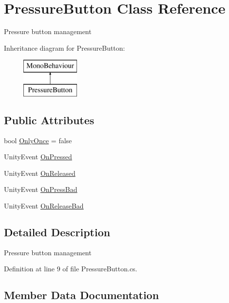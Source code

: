 \hypertarget{class_pressure_button}{}\section{Pressure\+Button Class Reference}
\label{class_pressure_button}


Pressure button management  


Inheritance diagram for Pressure\+Button\+:\begin{figure}[H]
\begin{center}
\leavevmode
\includegraphics[height=2.000000cm]{class_pressure_button}
\end{center}
\end{figure}
\subsection*{Public Attributes}
\begin{DoxyCompactItemize}
\item 
bool \mbox{\hyperlink{class_pressure_button_af684466a3f6afe1da890e20c265d07c6}{Only\+Once}} = false
\item 
Unity\+Event \mbox{\hyperlink{class_pressure_button_a75331263686a56126a5048151a05855c}{On\+Pressed}}
\item 
Unity\+Event \mbox{\hyperlink{class_pressure_button_af4513018957a5721b4ecdd58f5c9f8ff}{On\+Released}}
\item 
Unity\+Event \mbox{\hyperlink{class_pressure_button_a39553f5399d4913445bfc8a7f36e7bb3}{On\+Press\+Bad}}
\item 
Unity\+Event \mbox{\hyperlink{class_pressure_button_a2eeb88d6b3a61b95406ea13ece3481f4}{On\+Release\+Bad}}
\end{DoxyCompactItemize}


\subsection{Detailed Description}
Pressure button management 



Definition at line 9 of file Pressure\+Button.\+cs.



\subsection{Member Data Documentation}
\mbox{\label{class_pressure_button_af684466a3f6afe1da890e20c265d07c6}} 
